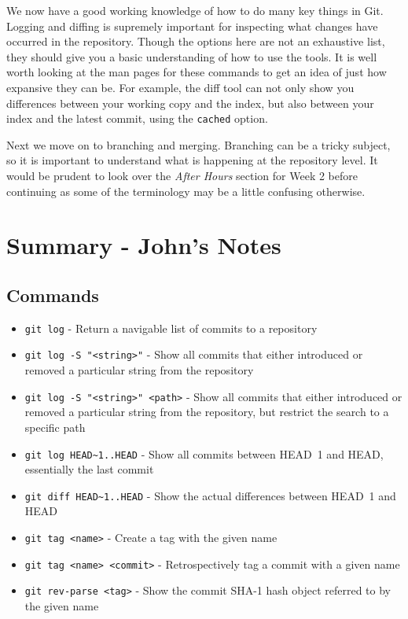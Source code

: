 We now have a good working knowledge of how to do many key things in Git.
Logging and diffing is supremely important for inspecting what changes have occurred in the repository.
Though the options here are not an exhaustive list, they should give you a basic understanding of how to use the tools.
It is well worth looking at the man pages for these commands to get an idea of just how expansive they can be.
For example, the diff tool can not only show you differences between your working copy and the index, but also between your index and the latest commit, using the \texttt{cached} option.

Next we move on to branching and merging.
Branching can be a tricky subject, so it is important to understand what is happening at the repository level.
It would be prudent to look over the \emph{After Hours} section for Week 2 before continuing as some of the terminology may be a little confusing otherwise.

\clearpage
\section{Summary - John's Notes}
\subsection{Commands}
\begin{itemize}
\item\texttt{git log} - Return a navigable list of commits to a repository
\item\texttt{git log -S "<string>"} - Show all commits that either introduced or removed a particular string from the repository
\item\texttt{git log -S "<string>" <path>} - Show all commits that either introduced or removed a particular string from the repository, but restrict the search to a specific path
\item\texttt{git log HEAD\textasciitilde1..HEAD} - Show all commits between HEAD~1 and HEAD, essentially the last commit
\item\texttt{git diff HEAD\textasciitilde1..HEAD} - Show the actual differences between HEAD~1 and HEAD
\item\texttt{git tag <name>} - Create a tag with the given name
\item\texttt{git tag <name> <commit>} - Retrospectively tag a commit with a given name
\item\texttt{git rev-parse <tag>} - Show the commit SHA-1 hash object referred to by the given name
\end{itemize}

